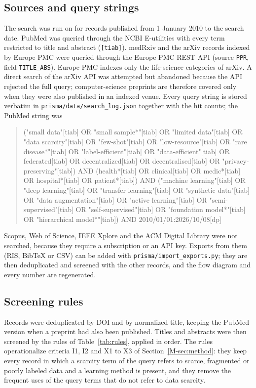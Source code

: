\documentclass[acmsmall,screen,nonacm]{acmart}
\theoremstyle{acmdefinition}
\begin{document}
\subsection{Sources and query strings}
The search was run on \PrismaSearchDate{} for records published from 1 January 2010 to the search date. PubMed was queried through the NCBI E-utilities with every term restricted to title and abstract (\texttt{[tiab]}). medRxiv and the arXiv records indexed by Europe PMC were queried through the Europe PMC REST API (source \texttt{PPR}, field \texttt{TITLE\_ABS}). Europe PMC indexes only the life-science categories of arXiv. A direct search of the arXiv API was attempted but abandoned because the API rejected the full query; computer-science preprints are therefore covered only when they were also published in an indexed venue. Every query string is stored verbatim in \texttt{prisma/data/search\_log.json} together with the hit counts; the PubMed string was
\begin{quote}
\raggedright\scriptsize\ttfamily
("small data"[tiab] OR "small sample*"[tiab] OR "limited data"[tiab] OR "data scarcity"[tiab] OR "few-shot"[tiab] OR "low-resource"[tiab] OR "rare disease*"[tiab] OR "label-efficient"[tiab] OR "data-efficient"[tiab] OR federated[tiab] OR decentralized[tiab] OR decentralised[tiab] OR "privacy-preserving"[tiab]) AND (health*[tiab] OR clinical[tiab] OR medic*[tiab] OR hospital*[tiab] OR patient*[tiab]) AND ("machine learning"[tiab] OR "deep learning"[tiab] OR "transfer learning"[tiab] OR "synthetic data"[tiab] OR "data augmentation"[tiab] OR "active learning"[tiab] OR "semi-supervised"[tiab] OR "self-supervised"[tiab] OR "foundation model*"[tiab] OR "hierarchical model*"[tiab]) AND 2010/01/01:2026/10/08[dp]
\end{quote}
Scopus, Web of Science, IEEE Xplore and the ACM Digital Library were not searched, because they require a subscription or an API key. Exports from them (RIS, BibTeX or CSV) can be added with \texttt{prisma/import\_exports.py}; they are then deduplicated and screened with the other records, and the flow diagram and every number are regenerated.

\subsection{Screening rules}
Records were deduplicated by DOI and by normalized title, keeping the PubMed version when a preprint had also been published. Titles and abstracts were then screened by the rules of Table~\ref{tab:rules}, applied in order. The rules operationalize criteria I1, I2 and X1 to X3 of Section~\ref{M-sec:method}: they keep every record in which a scarcity term of the query refers to scarce, fragmented or poorly labeled data and a learning method is present, and they remove the frequent uses of the query terms that do not refer to data scarcity.
\end{document}
